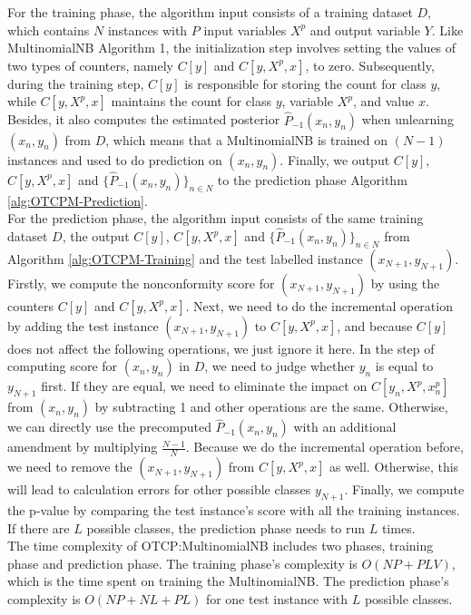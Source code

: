 \documentclass[10pt]{reportMaster}
\begin{document}
\noindent For the training phase, the algorithm input consists of a training dataset $D$, which contains $N$ instances with $P$ input variables $X^p$ and output variable $Y$. Like MultinomialNB Algorithm 1, the initialization step involves setting the values of two types of counters, namely $C[y]$ and $C[y, X^p, x]$, to zero. Subsequently, during the training step, $C[y]$ is responsible for storing the count for class $y$, while $C[y, X^p, x]$ maintains the count for class $y$, variable $X^p$, and value $x$. Besides, it also computes the estimated posterior $\hat{P}_{-1}(x_n,y_n)$ when unlearning $(x_n,y_n)$ from $D$, which means that a MultinomialNB is trained on $(N-1)$ instances and used to do prediction on $(x_n,y_n)$. Finally, we output $C[y]$, $C[y, X^p,x]$ and $\{\hat{P}_{-1}(x_n,y_n)\}_{n \in N}$ to the prediction phase Algorithm \ref{alg:OTCPM-Prediction}.\\

\noindent For the prediction phase, the algorithm input consists of the same training dataset $D$, the output $C[y]$, $C[y, X^p,x]$ and $\{\hat{P}_{-1}(x_n,y_n)\}_{n \in N}$ from Algorithm \ref{alg:OTCPM-Training} and the test labelled instance $(x_{N+1}, y_{N+1})$. Firstly, we compute the nonconformity score for $(x_{N+1}, y_{N+1})$ by using the counters $C[y]$ and $C[y, X^p,x]$. Next, we need to do the incremental operation by adding the test instance $(x_{N+1}, y_{N+1})$ to $C[y, X^p,x]$, and because $C[y]$ does not affect the following operations, we just ignore it here. In the step of computing score for $(x_n,y_n)$ in $D$, we need to judge whether $y_n$ is equal to $y_{N+1}$ first. If they are equal, we need to eliminate the impact on $C[y_n, X^p,x_n^p]$ from $(x_n,y_n)$ by subtracting 1 and other operations are the same. Otherwise, we can directly use the precomputed $\hat{P}_{-1}(x_n,y_n)$ with an additional amendment by multiplying $\frac{N-1}{N}$. Because we do the incremental operation before, we need to remove the $(x_{N+1}, y_{N+1})$ from $C[y, X^p,x]$ as well. Otherwise, this will lead to calculation errors for other possible classes $y_{N+1}$. Finally, we compute the p-value by comparing the test instance's score with all the training instances. If there are $L$ possible classes, the prediction phase needs to run $L$ times.\\

\noindent The time complexity of OTCP:MultinomialNB includes two phases, training phase and prediction phase. The training phase's complexity is $O(NP+PLV)$, which is the time spent on training the MultinomialNB. The prediction phase's complexity is $O(NP+NL+PL)$ for one test instance with $L$ possible classes.
\end{document}
